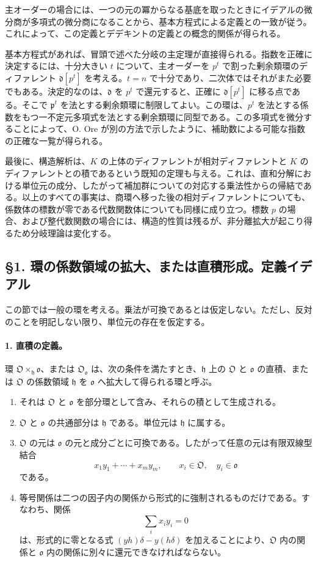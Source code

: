 主オーダーの場合には、一つの元の冪からなる基底を取ったときにイデアルの微分商が多項式の微分商になることから、基本方程式による定義との一致が従う。これによって、この定義とデデキントの定義との概念的関係が得られる。

基本方程式があれば、冒頭で述べた分岐の主定理が直接得られる。指数を正確に決定するには、十分大きい \(t\) について、主オーダーを \(p^t\) で割った剰余類環のディファレント \(\mathfrak d[p^t]\) を考える。\(t=n\) で十分であり、二次体ではそれがまた必要でもある。決定的なのは、\(\mathfrak d\) を \(p^t\) で還元すると、正確に \(\mathfrak d[p^t]\) に移る点である。そこで \(\mathfrak p^t\) を法とする剰余類環に制限してよい。この環は、\(p^t\) を法とする係数をもつ一不定元多項式を法とする剰余類環に同型である。この多項式を微分することによって、O. Ore が別の方法で示したように、補助数による可能な指数の正確な一覧が得られる。

最後に、構造解析は、\(K\) の上体のディファレントが相対ディファレントと \(K\) のディファレントとの積であるという既知の定理も与える。これは、直和分解における単位元の成分、したがって補加群についての対応する乗法性からの帰結である。以上のすべての事実は、商環へ移った後の相対ディファレントについても、係数体の標数が零である代数関数体についても同様に成り立つ。標数 \(p\) の場合、および整代数関数の場合には、構造的性質は残るが、非分離拡大が起こり得るため分岐理論は変化する。

\subsection*{§1. 環の係数領域の拡大、または直積形成。定義イデアル}

この節では一般の環を考える。乗法が可換であるとは仮定しない。ただし、反対のことを明記しない限り、単位元の存在を仮定する。

\paragraph{1. 直積の定義。}
環 \(\mathfrak O\times_{\mathfrak h}\mathfrak o\)、または \(\mathfrak O_{\mathfrak o}\) は、次の条件を満たすとき、\(\mathfrak h\) 上の \(\mathfrak O\) と \(\mathfrak o\) の直積、または \(\mathfrak O\) の係数領域 \(\mathfrak h\) を \(\mathfrak o\) へ拡大して得られる環と呼ぶ。

\begin{enumerate}
\item それは \(\mathfrak O\) と \(\mathfrak o\) を部分環として含み、それらの積として生成される。
\item \(\mathfrak O\) と \(\mathfrak o\) の共通部分は \(\mathfrak h\) である。単位元は \(\mathfrak h\) に属する。
\item \(\mathfrak O\) の元は \(\mathfrak o\) の元と成分ごとに可換である。したがって任意の元は有限双線型結合
\[
        x_1y_1+\cdots+x_my_m,
        \qquad x_i\in\mathfrak O,
        \quad y_i\in\mathfrak o
\]
である。
\item 等号関係は二つの因子内の関係から形式的に強制されるものだけである。すなわち、関係
\[
        \sum_i x_i y_i=0
\]
は、形式的に零となる式 \((yh)\delta-y(h\delta)\) を加えることにより、\(\mathfrak O\) 内の関係と \(\mathfrak o\) 内の関係に別々に還元できなければならない。
\end{enumerate}


